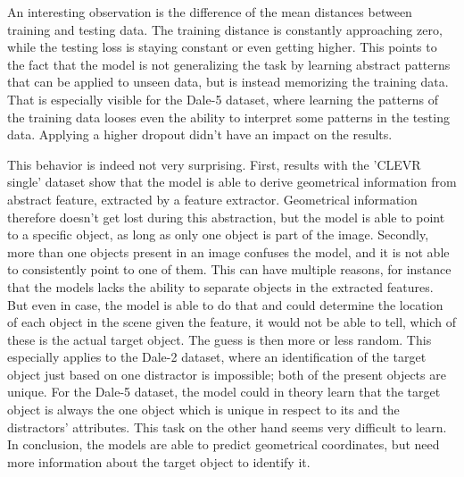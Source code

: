 An interesting observation is the difference of the mean distances between training and testing data.
The training distance is constantly approaching zero, while the testing loss is staying constant or even getting higher.
This points to the fact that the model is not generalizing the task by learning abstract patterns that can be applied to unseen data, but is instead memorizing the training data.
That is especially visible for the Dale-5 dataset, where learning the patterns of the training data looses even the ability to interpret some patterns in the testing data.
Applying a higher dropout didn't have an impact on the results.

This behavior is indeed not very surprising.
First, results with the 'CLEVR single' dataset show that the model is able to derive geometrical information from abstract feature, extracted by a feature extractor.
Geometrical information therefore doesn't get lost during this abstraction, but the model is able to point to a specific object, as long as only one object is part of the image.
Secondly, more than one objects present in an image confuses the model, and it is not able to consistently point to one of them.
This can have multiple reasons, for instance that the models lacks the ability to separate objects in the extracted features.
But even in case, the model is able to do that and could determine the location of each object in the scene given the feature, it would not be able to tell, which of these is the actual target object.
The guess is then more or less random.
This especially applies to the Dale-2 dataset, where an identification of the target object just based on one distractor is impossible; both of the present objects are unique.
For the Dale-5 dataset, the model could in theory learn that the target object is always the one object which is unique in respect to its and the distractors' attributes.
This task on the other hand seems very difficult to learn.
In conclusion, the models are able to predict geometrical coordinates, but need more information about the target object to identify it.

